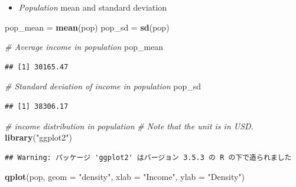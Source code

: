 \documentclass[]{book}
\newenvironment{Shaded}{\begin{snugshade}}{\end{snugshade}}
\newcommand{\KeywordTok}[1]{\textcolor[rgb]{0.13,0.29,0.53}{\textbf{#1}}}
\newcommand{\DataTypeTok}[1]{\textcolor[rgb]{0.13,0.29,0.53}{#1}}
\newcommand{\StringTok}[1]{\textcolor[rgb]{0.31,0.60,0.02}{#1}}
\newcommand{\CommentTok}[1]{\textcolor[rgb]{0.56,0.35,0.01}{\textit{#1}}}
\newcommand{\OperatorTok}[1]{\textcolor[rgb]{0.81,0.36,0.00}{\textbf{#1}}}
\newcommand{\NormalTok}[1]{#1}
\providecommand{\tightlist}{%
  \setlength{\itemsep}{0pt}\setlength{\parskip}{0pt}}
\begin{document}
\begin{Shaded}
\end{Shaded}

\begin{itemize}
\tightlist
\item
  \emph{Population} mean and standard deviation
\end{itemize}

\begin{Shaded}
\begin{Highlighting}[]
\NormalTok{pop_mean =}\StringTok{ }\KeywordTok{mean}\NormalTok{(pop)}
\NormalTok{pop_sd   =}\StringTok{ }\KeywordTok{sd}\NormalTok{(pop)}

\CommentTok{# Average income in population}
\NormalTok{pop_mean}
\end{Highlighting}
\end{Shaded}

\begin{verbatim}
## [1] 30165.47
\end{verbatim}

\begin{Shaded}
\begin{Highlighting}[]
\CommentTok{# Standard deviation of income in population}
\NormalTok{pop_sd}
\end{Highlighting}
\end{Shaded}

\begin{verbatim}
## [1] 38306.17
\end{verbatim}

\begin{Shaded}
\begin{Highlighting}[]
\CommentTok{# income distribution in population}
\CommentTok{# Note that the unit is in USD.}
\KeywordTok{library}\NormalTok{(}\StringTok{"ggplot2"}\NormalTok{)}
\end{Highlighting}
\end{Shaded}

\begin{verbatim}
## Warning: パッケージ 'ggplot2' はバージョン 3.5.3 の R の下で造られました
\end{verbatim}

\begin{Shaded}
\begin{Highlighting}[]
\KeywordTok{qplot}\NormalTok{(pop, }\DataTypeTok{geom =} \StringTok{"density"}\NormalTok{, }
      \DataTypeTok{xlab =} \StringTok{"Income"}\NormalTok{,}
      \DataTypeTok{ylab =} \StringTok{"Density"}\NormalTok{)}
\end{Highlighting}
\end{Shaded}
\end{document}
